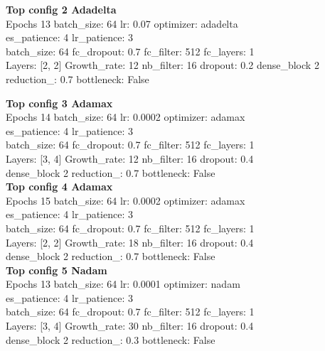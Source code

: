 \textbf{Top config 2 Adadelta}\\
Epochs  13  batch\_size:  64  lr:  0.07  optimizer:  adadelta \\
es\_patience:  4  lr\_patience:  3\\
batch\_size:  64  fc\_dropout:  0.7  fc\_filter:  512 fc\_layers:  1\\
Layers:  [2, 2]  Growth\_rate:  12 nb\_filter:  16  dropout:  0.2 
dense\_block  2 reduction\_:  0.7  bottleneck:  False

\textbf{Top config 3 Adamax}\\
Epochs  14  batch\_size:  64  lr:  0.0002  optimizer:  adamax \\
 es\_patience:  4  lr\_patience:  3\\
 batch\_size:  64  fc\_dropout:  0.7  fc\_filter:  512  fc\_layers:  1 \\
Layers:  [3, 4]  Growth\_rate:  12  nb\_filter:  16  dropout:  0.4 \\
dense\_block  2  reduction\_:  0.7  bottleneck:  False \\

\textbf{Top config 4 Adamax}\\
Epochs  15  batch\_size:  64  lr:  0.0002  optimizer:  adamax\\
 es\_patience:  4  lr\_patience:  3 \\
 batch\_size:  64  fc\_dropout:  0.7  fc\_filter:  512  fc\_layers:  1 \\
Layers:  [2, 2]  Growth\_rate:  18  nb\_filter:  16  dropout:  0.4 \\
dense\_block  2  reduction\_:  0.7  bottleneck:  False\\

\textbf{Top config 5 Nadam}\\
Epochs  13  batch\_size:  64  lr:  0.0001  optimizer:  nadam\\
 es\_patience:  4  lr\_patience:  3 \\
 batch\_size:  64  fc\_dropout:  0.7  fc\_filter:  512  fc\_layers:  1\\
Layers:  [3, 4]  Growth\_rate:  30  nb\_filter:  16  dropout:  0.4\\
dense\_block  2  reduction\_:  0.3  bottleneck:  False


